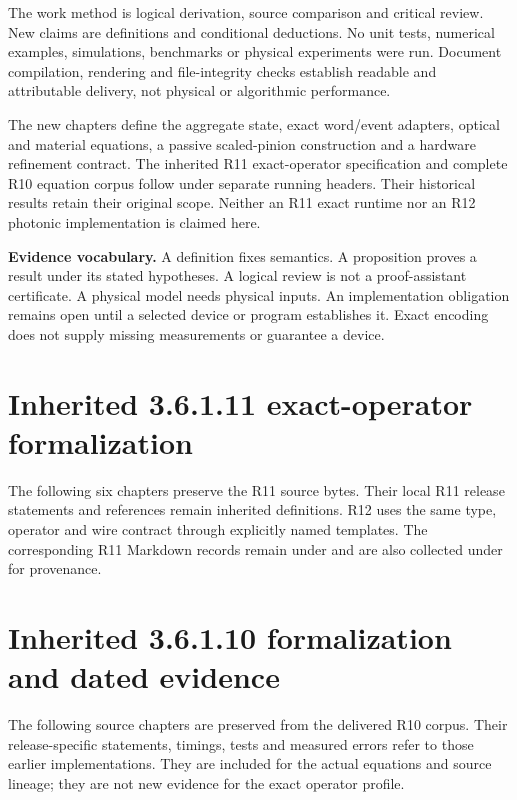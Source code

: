 The work method is logical derivation, source comparison and critical review.
New claims are definitions and conditional deductions. No unit tests,
numerical examples, simulations, benchmarks or physical experiments were run.
Document compilation, rendering and file-integrity checks establish readable
and attributable delivery, not physical or algorithmic performance.

The new chapters define the aggregate state, exact word/event adapters,
optical and material equations, a passive scaled-pinion construction and a
hardware refinement contract. The inherited R11 exact-operator specification
and complete R10 equation corpus follow under separate running headers.
Their historical results retain their original scope. Neither an R11 exact
runtime nor an R12 photonic implementation is claimed here.

\begin{panel}
\textbf{Evidence vocabulary.} A definition fixes semantics. A proposition proves
a result under its stated hypotheses. A logical review is not a proof-assistant
certificate. A physical model needs physical inputs. An implementation
obligation remains open until a selected device or program establishes it.
Exact encoding does not supply missing measurements or guarantee a device.
\end{panel}
\tableofcontents\clearpage





\clearpage
\section*{Inherited 3.6.1.11 exact-operator formalization}
\fancyhead[R]{\sffamily\small\textcolor{muted}{INHERITED R11 / DEFINITIONS}}
The following six chapters preserve the R11 source bytes. Their local R11
release statements and references remain inherited definitions. R12 uses the
same type, operator and wire contract through explicitly named templates.
The corresponding R11 Markdown records remain under  and are
also collected under  for provenance.






\clearpage
\section*{Inherited 3.6.1.10 formalization and dated evidence}
\fancyhead[R]{\sffamily\small\textcolor{muted}{INHERITED R10 / DATED EVIDENCE}}
The following source chapters are preserved from the delivered R10 corpus.
Their release-specific statements, timings, tests and measured errors refer to
those earlier implementations. They are included for the actual equations and
source lineage; they are not new evidence for the exact operator profile.




